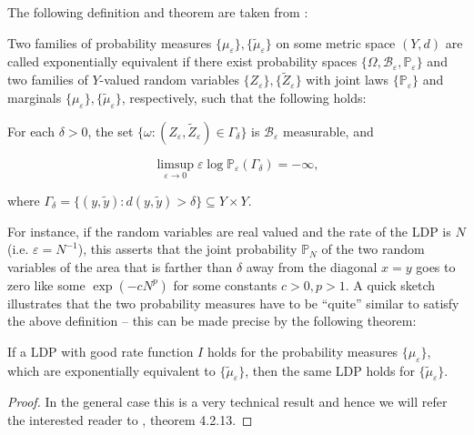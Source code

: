 The following definition and theorem are taken from \cite{Dembo2009LargeDeviations}:

\begin{definition}\label{def:exponentialequivalence}
	Two families of probability measures $\{\mu_\varepsilon\}, \{\tilde \mu_\varepsilon\}$ on some metric space $(Y,d)$ are called exponentially equivalent if there exist probability spaces $\{\Omega, \mathcal B_\varepsilon,\mathbb P_\varepsilon\}$ and two families of $Y$-valued random variables $\{Z_\varepsilon\}, \{\tilde Z_\varepsilon\}$ with joint laws $\{\mathbb P_\varepsilon\}$ and marginals $\{\mu_\varepsilon\}, \{\tilde \mu_\varepsilon\}$, respectively, such that the following holds:
	
	For each $\delta>0$, the set $\{\omega : (Z_\varepsilon, \tilde Z_\varepsilon)\in\Gamma_\delta\}$ is $\mathcal B_\varepsilon$ measurable, and 
	
	$$\limsup_{\varepsilon\rightarrow 0}\varepsilon\log\mathbb P_\varepsilon(\Gamma_\delta)=-\infty,$$
	
	where $\Gamma_\delta = \{(y,\tilde y):d(y,\tilde y)>\delta\}\subseteq Y\times Y$.
\end{definition}

For instance, if the random variables are real valued and the rate of the LDP is $N$ (i.e. $\varepsilon = N^{-1}$), this asserts that the joint probability $\mathbb P_N$ of the two random variables of the area that is farther than $\delta$ away from the diagonal $x=y$ goes to zero like some $\exp(-cN^p)$ for some constants $c>0, p>1$. A quick sketch illustrates that the two probability measures have to be ``quite'' similar to satisfy the above definition -- this can be made precise by the following theorem:

\begin{theorem}
	If a LDP with good rate function $I$ holds for the probability measures $\{\mu_\varepsilon\}$, which are exponentially equivalent to $\{\tilde\mu_\varepsilon\}$, then the same LDP holds for $\{\tilde\mu_\varepsilon\}$.
\end{theorem}
\begin{proof}
	In the general case this is a very technical result and hence we will refer the interested reader to \cite{Dembo2009LargeDeviations}, theorem 4.2.13.
\end{proof}

